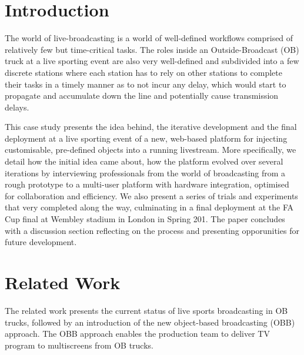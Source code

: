 \documentclass[sigchi-a, authorversion]{acmart}
\begin{document}


\begin{abstract}
    \ldots
\end{abstract}





\maketitle

\section{Introduction}

 The world of live-broadcasting is a world of well-defined workflows comprised
 of relatively few but time-critical tasks. The roles inside an
 Outside-Broadcast (OB) truck at a live sporting event are also very
 well-defined and subdivided into a few discrete stations where each station
 has to rely on other stations to complete their tasks in a timely manner as to
 not incur any delay, which would start to propagate and accumulate down the
 line and potentially cause transmission delays.

 This case study presents the idea behind, the iterative development and the
 final deployment at a live sporting event of a new, web-based platform for
 injecting customisable, pre-defined objects into a running livestream. More
 specifically, we detail how the initial idea came about, how the platform
 evolved over several iterations by interviewing professionals from the world
 of broadcasting from a rough prototype to a multi-user platform with hardware
 integration, optimised for collaboration and efficiency. We also present a
 series of trials and experiments that very completed along the way,
 culminating in a final deployment at the FA Cup final at Wembley stadium in
 London in Spring 201. The paper concludes with a discussion section reflecting
 on the process and presenting opporunities for future development.

\section{Related Work}
The related work presents the current status of live sports broadcasting in OB trucks, followed by an introduction of the new object-based broadcasting (OBB) approach. The OBB approach enables the production team to deliver TV program to multiscreens from OB trucks.
\end{document}
